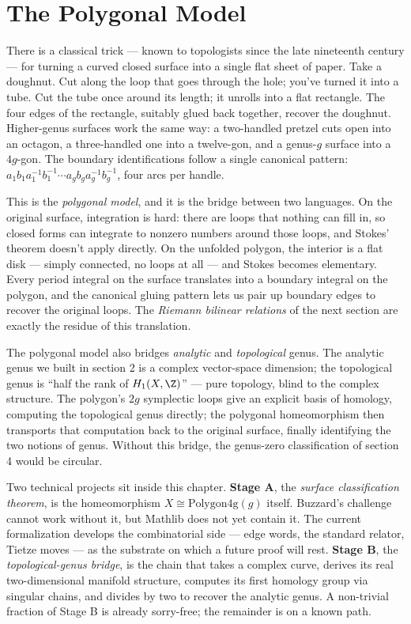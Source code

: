 \section{The Polygonal Model}
\label{sec:polygonal-model}

\begin{layman}
There is a classical trick --- known to topologists since the late
nineteenth century --- for turning a curved closed surface into a
single flat sheet of paper. Take a doughnut. Cut along the loop
that goes through the hole; you've turned it into a tube. Cut the
tube once around its length; it unrolls into a flat rectangle.
The four edges of the rectangle, suitably glued back together,
recover the doughnut. Higher-genus surfaces work the same way: a
two-handled pretzel cuts open into an octagon, a three-handled one
into a twelve-gon, and a genus-\(g\) surface into a \(4g\)-gon.
The boundary identifications follow a single canonical pattern:
\(a_1 b_1 a_1^{-1} b_1^{-1} \cdots a_g b_g a_g^{-1} b_g^{-1}\),
four arcs per handle.

This is the \emph{polygonal model}, and it is the bridge between
two languages. On the original surface, integration is hard: there
are loops that nothing can fill in, so closed forms can integrate
to nonzero numbers around those loops, and Stokes' theorem doesn't
apply directly. On the unfolded polygon, the interior is a flat
disk --- simply connected, no loops at all --- and Stokes becomes
elementary. Every period integral on the surface translates into a
boundary integral on the polygon, and the canonical gluing pattern
lets us pair up boundary edges to recover the original loops.
The \emph{Riemann bilinear relations} of the next section are
exactly the residue of this translation.

The polygonal model also bridges \emph{analytic} and
\emph{topological} genus. The analytic genus we built in section
2 is a complex vector-space dimension; the topological genus is
``half the rank of \(H_1(X,\Z)\)'' --- pure topology, blind to the
complex structure. The polygon's \(2g\) symplectic loops give an
explicit basis of homology, computing the topological genus
directly; the polygonal homeomorphism then transports that
computation back to the original surface, finally identifying the
two notions of genus. Without this bridge, the genus-zero
classification of section 4 would be circular.

Two technical projects sit inside this chapter. \textbf{Stage A},
the \emph{surface classification theorem}, is the homeomorphism
\(X \cong \mathrm{Polygon4g}(g)\) itself. Buzzard's challenge cannot
work without it, but Mathlib does not yet contain it. The current
formalization develops the combinatorial side --- edge words, the
standard relator, Tietze moves --- as the substrate on which a future
proof will rest. \textbf{Stage B}, the \emph{topological-genus
bridge}, is the chain that takes a complex curve, derives its real
two-dimensional manifold structure, computes its first homology
group via singular chains, and divides by two to recover the
analytic genus. A non-trivial fraction of Stage B is already
sorry-free; the remainder is on a known path.
\end{layman}

